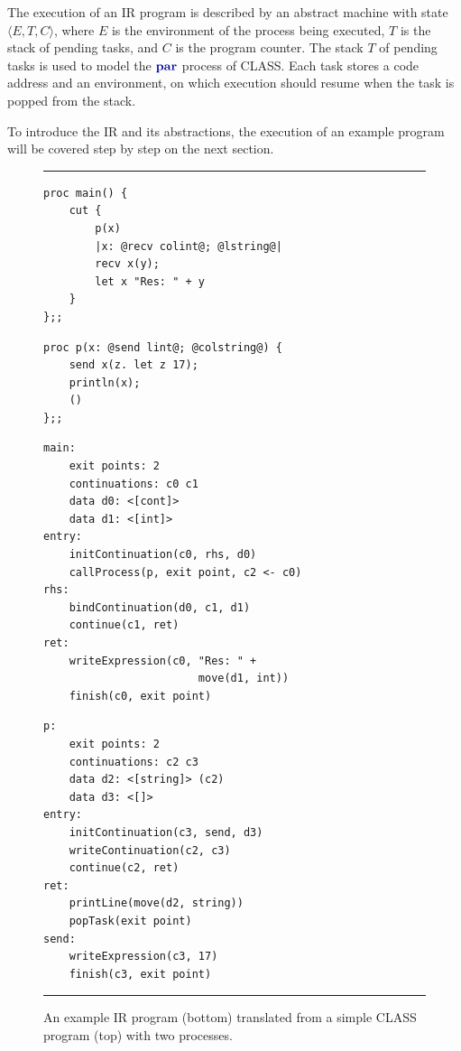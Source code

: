 The execution of an \ac{IR} program is described by an abstract machine with state $\langle E, T, C \rangle$, where $E$ is the environment of the process being executed, $T$ is the stack of pending tasks, and $C$ is the program counter. The stack $T$ of pending tasks is used to model the $\parp$ process of \ac{CLASS}. Each task stores a code address and an environment, on which execution should resume when the task is popped from the stack.

To introduce the \ac{IR} and its abstractions, the execution of an example program will be covered step by step on the next section.

\begin{figure}
    \hrule
    \begin{minipage}[t]{0.5\textwidth}
    \begin{lstlisting}[language=CLASS]
proc main() {
    cut {
        p(x)
        |x: @recv colint@; @lstring@|
        recv x(y);
        let x "Res: " + y
    }
};;
    \end{lstlisting}
    \end{minipage}
    \hfill
    \begin{minipage}[t]{0.45\textwidth}
    \begin{lstlisting}[language=CLASS,firstnumber=9]
proc p(x: @send lint@; @colstring@) {
    send x(z. let z 17);
    println(x);
    ()
};;
    \end{lstlisting}
    \end{minipage}
    \noindent
    \makebox[\textwidth]{\hrulefill\quad\raisebox{-1ex}{\Large$\Downarrow$}\quad\hrulefill}
    \begin{minipage}[t]{0.5\textwidth}
    \begin{lstlisting}[language=IR,firstnumber=1]
main:
    exit points: 2
    continuations: c0 c1
    data d0: <[cont]>
    data d1: <[int]>
entry:
    initContinuation(c0, rhs, d0)
    callProcess(p, exit point, c2 <- c0)
rhs:
    bindContinuation(d0, c1, d1)
    continue(c1, ret)
ret:
    writeExpression(c0, "Res: " +
                        move(d1, int))
    finish(c0, exit point)
    \end{lstlisting}
    \end{minipage}
    \hfill
    \begin{minipage}[t]{0.45\textwidth}
    \begin{lstlisting}[language=IR,firstnumber=16]
p:
    exit points: 2
    continuations: c2 c3
    data d2: <[string]> (c2)
    data d3: <[]>
entry:
    initContinuation(c3, send, d3)
    writeContinuation(c2, c3)
    continue(c2, ret)
ret:
    printLine(move(d2, string))
    popTask(exit point)
send:
    writeExpression(c3, 17)
    finish(c3, exit point)
    \end{lstlisting}
    \end{minipage}
    \hrule
    \caption{An example IR program (bottom) translated from a simple CLASS program (top) with two processes.}
    \label{fig:IRProcessExample}
\end{figure}

